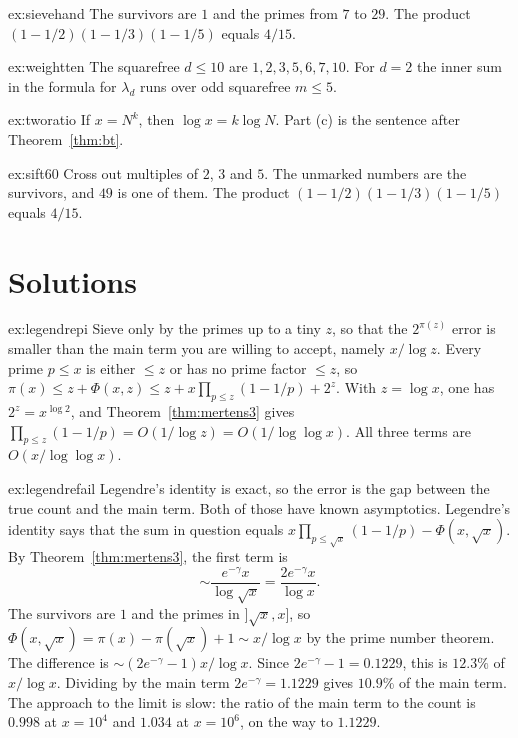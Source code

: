 \begin{hint}{ex:sievehand}
The survivors are $1$ and the primes from $7$ to $29$. The product $(1-1/2)(1-1/3)(1-1/5)$ equals $4/15$.
\end{hint}
\begin{hint}{ex:weightten}
The squarefree $d\le10$ are $1,2,3,5,6,7,10$. For $d=2$ the inner sum in the formula for $\lambda_d$ runs over odd squarefree $m\le5$.
\end{hint}
\begin{hint}{ex:tworatio}
If $x=N^k$, then $\log x=k\log N$. Part (c) is the sentence after Theorem~\ref{thm:bt}.
\end{hint}
\begin{hint}{ex:sift60}
Cross out multiples of $2$, $3$ and $5$. The unmarked numbers are the survivors, and $49$ is one of them. The product $(1-1/2)(1-1/3)(1-1/5)$ equals $4/15$.
\end{hint}

\section{Solutions}

\begin{solution}{ex:legendrepi}
\idea Sieve only by the primes up to a tiny $z$, so that the $2^{\pi(z)}$ error is smaller than the main term you are willing to accept, namely $x/\log z$.
\writeup Every prime $p\le x$ is either $\le z$ or has no prime factor $\le z$, so $\pi(x)\le z+\Phi(x,z)\le z+x\prod_{p\le z}(1-1/p)+2^z$. With $z=\log x$, one has $2^z=x^{\log2}$, and Theorem~\ref{thm:mertens3} gives $\prod_{p\le z}(1-1/p)=O(1/\log z)=O(1/\log\log x)$. All three terms are $O(x/\log\log x)$.
\end{solution}

\begin{solution}{ex:legendrefail}
\idea Legendre's identity is exact, so the error is the gap between the true count and the main term. Both of those have known asymptotics.
\writeup Legendre's identity says that the sum in question equals $x\prod_{p\le\sqrt x}(1-1/p)-\Phi(x,\sqrt x)$. By Theorem~\ref{thm:mertens3}, the first term is
\[
\sim\frac{e^{-\gamma}x}{\log\sqrt x}=\frac{2e^{-\gamma}x}{\log x}.
\]
The survivors are $1$ and the primes in $]\sqrt x,x]$, so $\Phi(x,\sqrt x)=\pi(x)-\pi(\sqrt x)+1\sim x/\log x$ by the prime number theorem. The difference is $\sim(2e^{-\gamma}-1)x/\log x$. Since $2e^{-\gamma}-1=0.1229$, this is $12.3\%$ of $x/\log x$. Dividing by the main term $2e^{-\gamma}=1.1229$ gives $10.9\%$ of the main term. The approach to the limit is slow: the ratio of the main term to the count is $0.998$ at $x=10^4$ and $1.034$ at $x=10^6$, on the way to $1.1229$.
\end{solution}

